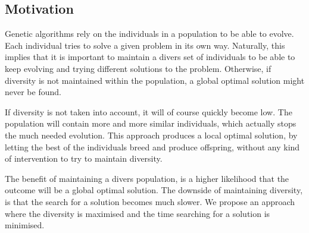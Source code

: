 
\subsection{Motivation}
\label{sec:motivation}


Genetic algorithms rely on the individuals in a population to be able to evolve. Each individual tries to solve a given problem in its own way. Naturally, this implies that it is important to maintain a divers set of individuals to be able to keep evolving and trying different solutions to the problem. Otherwise, if diversity is not maintained within the population, a global optimal solution might never be found.
\cite{ursem2002diversity}

If diversity is not taken into account, it will of course quickly become low. The population will contain more and more similar individuals, which actually stops the much needed evolution. This approach produces a local optimal solution, by letting the best of the individuals breed and produce offspring, without any kind of intervention to try to maintain diversity. 

The benefit of maintaining a divers population, is a higher likelihood that the outcome will be a global optimal solution. The downside of maintaining diversity, is that the search for a solution becomes much slower. We propose an approach where the diversity is maximised and the time searching for a solution is minimised.
